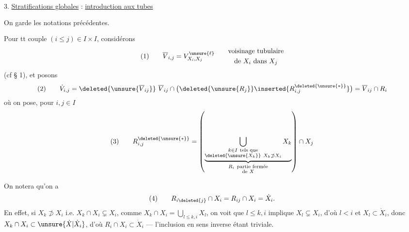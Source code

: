 3. \uline{Stratifications globales} : \uline{introduction aux tubes}

On garde les notations précédentes.

Pour tt couple $(i\leq j)\in I\times I$, considérons
\[
(1)\qquad \overline V_{i,j}=V^{\unsure{\ell}}_{X_i,X_j}\qquad
\begin{gathered}\text{voisinage tubulaire}\\\text{de }X_i\text{ dans }X_j\end{gathered}
\]
(cf § 1), et posons
\[
(2)\qquad\dot V_{i,j}=\deleted{\unsure{\overline V_{ij}}}\ \overline V_{ij}\cap\bigl(\deleted{\unsure{R_j}}\inserted{R_{i,j}^{\deleted{\unsure{*}}}}\bigr)=\overline V_{ij}\cap R_i
\]
où on pose, pour $i,j\in I$
\[
(3)\qquad R_{i,j}^{\deleted{\unsure{*}}}=\left(
\underbrace{\bigcup_{\substack{k\in I\ \text{tels que}\\\deleted{\unsure{X_k}}\ X_k\not\supset X_i}}X_k}_{\substack{R_i\ \text{partie fermée}\\\text{de }X}}
\right)\cap X_j
\]


On notera qu'on a
\[
(4)\qquad R_{i\deleted{j}}\cap X_i=R_{ij}\cap X_i=\dot X_i.
\]
En effet, si $X_k\not\supset X_i$ i.e. $X_k\cap X_i\subsetneq X_i$, comme $X_k\cap X_i=\bigcup_{l\leq k,i}X_l$, on voit que  $l\leq k,i$ implique $X_l\subsetneq X_i$, d'où $l<i$ et $X_l\subset\dot X_i$, donc $X_k\cap X_i\subset\unsure{\dot X|\dot X_i}$, d'où $R_i\cap X_i\subset\dot X_i$ — l'inclusion en sens inverse étant triviale.
